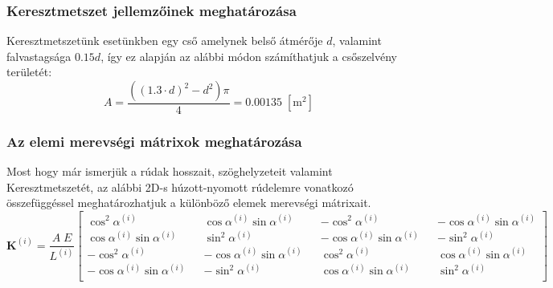 \documentclass[12pt,a4paper]{article}
\def\mx#1{\mathbf{#1}}
\def\mm{\; \left[\mathrm{m^2}\right]}
\def\i{\left(i\right)}
\def\cosalfa{\cos \alpha^{\i}}
\def\sinalfa{\sin \alpha^{\i}}
\def\cosalfasq{\cos^2 \alpha^{\i}}
\def\sinalfasq{\sin^2 \alpha^{\i}}
\begin{document}
\subsubsection{Keresztmetszet jellemzőinek meghatározása}
Keresztmetszetünk esetünkben egy cső amelynek belső átmérője $d$, valamint falvastagsága
$0.15 d$, így ez alapján az alábbi módon számíthatjuk a csőszelvény területét:
\begin{equation}
    A=\frac{\left(\left(1.3 \cdot d\right)^2-d^2\right) \pi }
    {4}=0.00135 \mm
\end{equation}
\subsubsection{Az elemi merevségi mátrixok meghatározása}
Most hogy már ismerjük a rúdak hosszait, szöghelyzeteit valamint Keresztmetszetét,
az alábbi 2D-s húzott-nyomott rúdelemre vonatkozó összefüggéssel meghatározhatjuk a
különböző elemek merevségi mátrixait.
\begin{equation}
    \mx{K}^{\i}=\frac{A \; E}{L^{\i}}
    \begin{bmatrix}
        \cosalfasq          &  & \cosalfa \sinalfa   &  & -\cosalfasq          &  & - \cosalfa  \sinalfa \\
        \cosalfa  \sinalfa  &  & \sinalfasq          &  & - \cosalfa  \sinalfa &  & -\sinalfasq          \\
        -\cosalfasq         &  & -\cosalfa  \sinalfa &  & \cosalfasq           &  & \cosalfa  \sinalfa   \\
        -\cosalfa  \sinalfa &  & -\sinalfasq         &  & \cosalfa  \sinalfa   &  & \sinalfasq           \\
    \end{bmatrix}
\end{equation}
\end{document}
